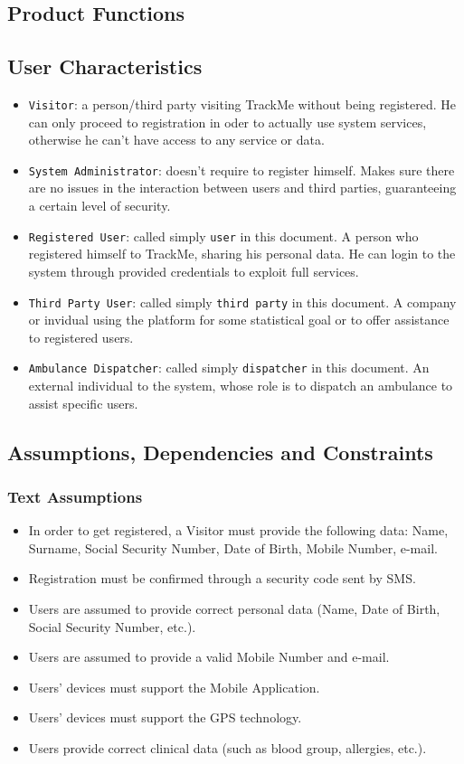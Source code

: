 \documentclass[12pt,a4paper]{article}
\begin{document}
	\newpage
	\subsection{Product Functions}
	
	\subsection{User Characteristics}
	\begin{itemize}
		\item \texttt{Visitor}: a person/third party visiting TrackMe without being registered. He can only proceed to registration in oder to actually use system services, otherwise he can't have access to any service or data.
		\item \texttt{System Administrator}: doesn't require to register himself. Makes sure there are no issues in the interaction between users and third parties, guaranteeing a certain level of security.
		\item \texttt{Registered User}: called simply \texttt{user} in this document. A person who registered himself to TrackMe, sharing his personal data. He can login to the system through provided credentials to exploit full services.
		\item \texttt{Third Party User}: called simply \texttt{third party} in this document. A company or invidual using the platform for some statistical goal or to offer assistance to registered users.
		\item \texttt{Ambulance Dispatcher}: called simply \texttt{dispatcher} in this document. An external individual to the system, whose role is to dispatch an ambulance to assist specific users.
	\end{itemize}
	
	\subsection{Assumptions, Dependencies and Constraints}
		\subsubsection{Text Assumptions}
			\begin{itemize}
				\item In order to get registered, a Visitor must provide the following data: Name, Surname, Social Security Number, Date of Birth, Mobile Number, e-mail.
				\item Registration must be confirmed through a security code sent by SMS.
				\item Users are assumed to provide correct personal data (Name, Date of Birth, Social Security Number, etc.).
				\item Users are assumed to provide a valid Mobile Number and e-mail.
				\item Users' devices must support the Mobile Application.
				\item Users' devices must support the GPS technology.
				\item Users provide correct clinical data (such as blood group, allergies, etc.).
			\end{itemize}
\end{document}
